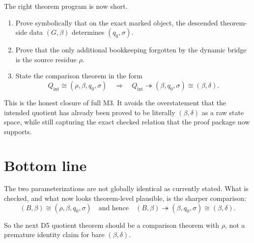 \documentclass[11pt]{article}
\begin{document}
The right theorem program is now short.

\begin{enumerate}[label=\textup{(\arabic*)},leftmargin=2.8em]
\item Prove symbolically that on the exact marked object, the descended
      theorem-side data $(G,\beta)$ determines $(q_0,\sigma)$.
\item Prove that the only additional bookkeeping forgotten by the dynamic
      bridge is the source residue $\rho$.
\item State the comparison theorem in the form
      \[
      Q_{\mathrm{int}}\cong (\rho,\beta,q_0,\sigma)
      \quad\Longrightarrow\quad
      Q_{\mathrm{int}}\twoheadrightarrow (\beta,q_0,\sigma)\cong(\beta,\delta).
      \]
\end{enumerate}

This is the honest closure of full M3. It avoids the overstatement that the
intended quotient has already been proved to be literally $(\beta,\delta)$ as a
raw state space, while still capturing the exact checked relation that the
proof package now supports.

\section{Bottom line}

The two parameterizations are not globally identical as currently stated.
What is checked, and what now looks theorem-level plausible, is the sharper
comparison:
\[
(B,\beta)\cong(\rho,\beta,q_0,\sigma)
\quad\text{and hence}\quad
(B,\beta)\twoheadrightarrow(\beta,q_0,\sigma)\cong(\beta,\delta).
\]

So the next D5 quotient theorem should be a comparison theorem with $\rho$, not
a premature identity claim for bare $(\beta,\delta)$.
\end{document}
